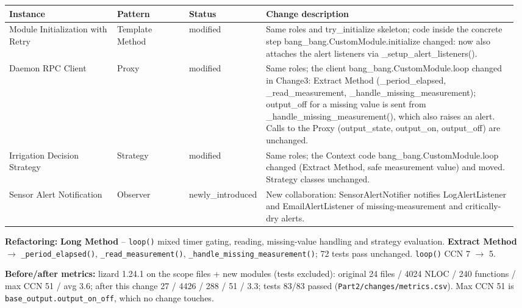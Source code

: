 \documentclass[11pt,a4paper]{article}
\newcommand{\field}[2]{\textbf{#1:} #2\par}
\begin{document}
{\small\setlength{\tabcolsep}{3pt}
\begin{longtable}{@{}P{0.21\linewidth}P{0.14\linewidth}P{0.13\linewidth}P{0.49\linewidth}@{}}\toprule
\textbf{Instance} & \textbf{Pattern} & \textbf{Status} & \textbf{Change description} \\ \midrule\endhead
Module Initialization with Retry & Template Method & modified & Same roles and try\_initialize skeleton; code inside the concrete step bang\_bang.CustomModule.initialize changed: now also attaches the alert listeners via \_setup\_alert\_listeners(). \\
Daemon RPC Client & Proxy & modified & Same roles; the client bang\_bang.CustomModule.loop changed in Change3: Extract Method (\_period\_elapsed, \_read\_measurement, \_handle\_missing\_measurement); output\_off for a missing value is sent from \_handle\_missing\_measurement(), which also raises an alert. Calls to the Proxy (output\_state, output\_on, output\_off) are unchanged. \\
Irrigation Decision Strategy & Strategy & modified & Same roles; the Context code bang\_bang.CustomModule.loop changed (Extract Method, safe measurement value) and moved. Strategy classes unchanged. \\
Sensor Alert Notification & Observer & newly\_introduced & New collaboration: SensorAlertNotifier notifies LogAlertListener and EmailAlertListener of missing-measurement and critically-dry alerts. \\
\bottomrule\end{longtable}}
\field{Refactoring}{\textbf{Long Method} -- \texttt{loop()} mixed timer gating, reading, missing-value handling and strategy evaluation. \textbf{Extract Method} $\rightarrow$ \texttt{\_\allowbreak{}period\_\allowbreak{}elapsed()}, \texttt{\_\allowbreak{}read\_\allowbreak{}measurement()}, \texttt{\_\allowbreak{}handle\_\allowbreak{}missing\_\allowbreak{}measurement()}; 72 tests pass unchanged. \texttt{loop()} CCN 7 $\rightarrow$ 5.}
\field{Before/after metrics}{lizard 1.24.1 on the scope files + new modules (tests excluded): original 24 files / 4024 NLOC / 240 functions / max CCN 51 / avg 3.6; after this change 27 / 4426 / 288 / 51 / 3.3; tests 83/83 passed (\texttt{Part2/\allowbreak{}changes/\allowbreak{}metrics.\allowbreak{}csv}). Max CCN 51 is \texttt{base\_\allowbreak{}output.\allowbreak{}output\_\allowbreak{}on\_\allowbreak{}off}, which no change touches.}
\end{document}
